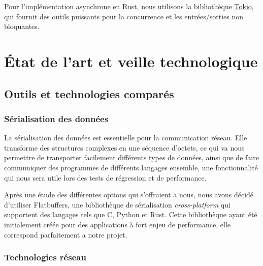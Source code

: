 \documentclass{article}
\begin{document}
Pour l'implémentation asynchrone en Rust, nous utilisons la bibliothèque \href{https://docs.rs/tokio/latest/tokio/}{Tokio}, qui fournit des outils puissants pour la concurrence et les entrées/sorties non bloquantes.


\section{État de l’art et veille technologique}

\subsection{Outils et technologies comparés}

\subsubsection{Sérialisation des données}


La sérialisation des données est essentielle pour la communication réseau. Elle transforme des structures complexes en une séquence d'octets, ce qui va nous permettre de transporter facilement différents types de données, ainsi que de faire communiquer des programmes de différents langages ensemble, une fonctionnalité qui nous sera utile lors des tests de régression et de performance.

Après une étude des différentes options qui s'offraient a nous, nous avons décidé d'utiliser Flatbuffers, une bibliothèque de sérialisation \textit{cross-platform} qui supportent des langages tels que C, Python et Rust. Cette bibliothèque ayant été initialement créée pour des applications à fort enjeu de performance, elle correspond parfaitement a notre projet.

\subsubsection{Technologies réseau}
\end{document}
